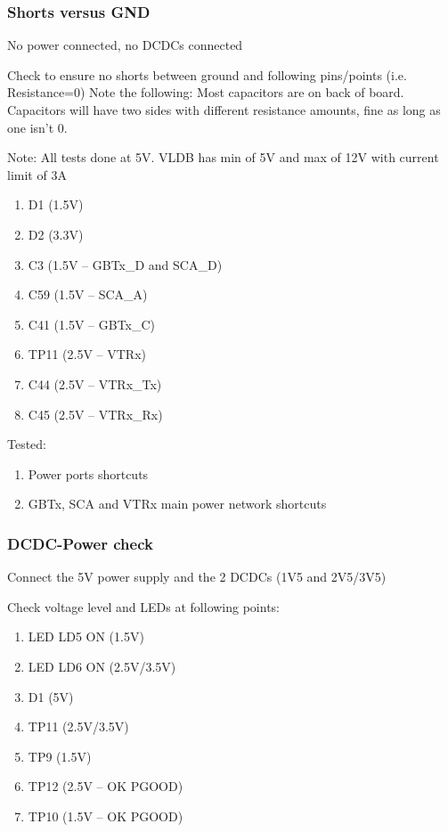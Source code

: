 \subsubsection{Shorts versus GND}

No power connected, no DCDCs connected

Check to ensure no shorts between ground and following pins/points (i.e. Resistance=0)
Note the following: Most capacitors are on back of board. Capacitors will have two sides with different resistance amounts, fine as long as one isn’t 0.

Note: All tests done at 5V. VLDB has min of 5V and max of 12V with current limit of 3A

\begin{enumerate}
    \item D1 (1.5V)
    \item D2 (3.3V)
    \item C3 (1.5V – GBTx_D and SCA_D)
    \item C59 (1.5V – SCA_A)
    \item C41 (1.5V – GBTx_C)
    \item TP11 (2.5V – VTRx)
    \item C44 (2.5V – VTRx_Tx)
    \item C45 (2.5V – VTRx_Rx)
\end{enumerate}

Tested:
\begin{enumerate}
    \item Power ports shortcuts
    \item GBTx, SCA and VTRx main power network shortcuts
\end{enumerate}


\subsubsection{DCDC-Power check}

Connect the 5V power supply and the 2 DCDCs (1V5 and 2V5/3V5)

Check voltage level and LEDs at following points:

\begin{enumerate}
    \item LED LD5 ON (1.5V)
    \item LED LD6 ON (2.5V/3.5V)
    \item D1 (5V)
    \item TP11 (2.5V/3.5V)
    \item TP9 (1.5V)
    \item TP12 (2.5V – OK PGOOD)
    \item TP10 (1.5V – OK PGOOD)
\end{enumerate}

